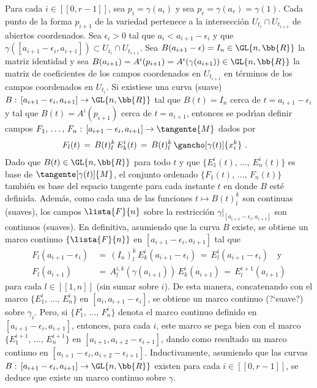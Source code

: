 Para cada $i\in[\![0,r-1]\!]$, sea $p_{i}=\gamma(a_{i})$ y sea
$p_{r}=\gamma(a_{r})=\gamma(1)$. Cada punto de la forma $p_{i+1}$ de la
variedad pertenece a la intersecci\'{o}n $U_{t_{i}}\cap U_{t_{i+1}}$ de
abiertos coordenados. Sea $\epsilon_{i}>0$ tal que
$a_{i}<a_{i+1}-\epsilon_{i}$ y que
$\gamma([a_{i+1}-\epsilon_{i},a_{i+1}])\subset U_{t_{i}}\cap U_{t_{i+1}}$.
Sea $B(a_{i+1}-\epsilon)=I_{n}\in\GL{n,\bb{R}}$ la matriz identidad y sea
$B(a_{i+1})=A^{i}(p_{i+1})=A^{i}(\gamma(a_{i+1}))\in\GL{n,\bb{R}}$ la matriz
de coeficientes de los campos coordenados en $U_{t_{i+1}}$ en t\'{e}rminos
de los campos coordenados en $U_{t_{i}}$. Si existiese una curva
(suave) $B:\,[a_{i+1}-\epsilon_{i},a_{i+1}]\rightarrow\GL{n,\bb{R}}$
tal que $B(t)=I_{n}$ cerca de $t=a_{i+1}-\epsilon_{i}$ y tal que
$B(t)=A^{i}(p_{i+1})$ cerca de $t=a_{i+1}$, entonces se podr\'{\i}an definir
campos $F_{1},\,\dots,\,F_{n}:\,[a_{i+1}-\epsilon_{i},a_{i+1}]\rightarrow%
\tangente{M}$ dados por
\begin{align*}
	F_{l}(t) & \,=\, B(t)^{k}_{l}\,E^{i}_{k}(t) \,=\,
		B(t)^{k}_{l}\,\gancho[\gamma(t)]{x_{i}^{k}}
	\text{ .}
\end{align*}
%
Dado que $B(t)\in\GL{n,\bb{R}}$ para todo $t$ y que
$\{E^{i}_{1}(t),\,\dots,\,E^{i}_{n}(t)\}$ es base de $\tangente[\gamma(t)]{M}$,
el conjunto ordenado $\{F_{1}(t),\,\dots,\,F_{n}(t)\}$ tambi\'{e}n es base
del espacio tangente para cada instante $t$ en donde $B$ est\'{e} definida.
Adem\'{a}s, como cada una de las funciones $t\mapsto B(t)^{k}_{l}$ son
continuas (suaves), los campos $\lista{F}{n}$ sobre la restricci\'{o}n
$\gamma|_{[a_{i+1}-\epsilon_{i},a_{i+1}]}$ son continuos (suaves). En
definitiva, asumiendo que la curva $B$ existe, se obtiene un marco continuo
$\{\lista{F}{n}\}$ en $[a_{i+1}-\epsilon_{i},a_{i+1}]$ tal que
\begin{align*}
	F_{l}(a_{i+1}-\epsilon_{i}) & \,=\,
		(I_{n})^{k}_{l}\,E^{i}_{k}(a_{i+1}-\epsilon_{i}) \,=\,
		E^{i}_{l}(a_{i+1}-\epsilon_{i})
	\quad\text{y} \\
	F_{l}(a_{i+1}) & \,=\,
		A^{i,k}_{l}(\gamma(a_{i+1}))\,E^{i}_{k}(a_{i+1}) \,=\,
		E^{i+1}_{l}(a_{i+1})
\end{align*}
%
para cada $l\in[\![1,n]\!]$ (sin sumar sobre $i$). De esta manera,
concatenando con el marco $\{E^{i}_{1},\,\dots,\,E^{i}_{n}\}$ en
$[a_{i},a_{i+1}-\epsilon_{i}]$, se obtiene un marco continuo (?`suave?)
sobre $\gamma_{i}$. Pero, si $\{F^{i}_{1},\,\dots,\,F^{i}_{n}\}$ denota
el marco continuo definido en $[a_{i+1}-\epsilon_{i},a_{i+1}]$, entonces,
para cada $i$, este marco se pega bien con el marco
$\{E^{i+1}_{1},\,\dots,\,E^{i+1}_{n}\}$ en $[a_{i+1},a_{i+2}-\epsilon_{i+1}]$,
dando como resultado un marco continuo en
$[a_{i+1}-\epsilon_{i},a_{i+2}-\epsilon_{i+1}]$. Inductivamente, asumiendo
que las curvas $B:\,[a_{i+1}-\epsilon_{i},a_{i+1}]\rightarrow\GL{n,\bb{R}}$
existen para cada $i\in[\![0,r-1]\!]$, se deduce que existe un marco
continuo sobre $\gamma$.

